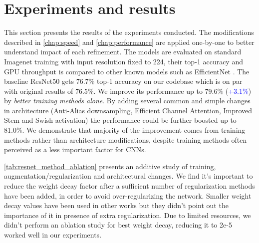 % 
\chapter{Experiments and results}


This section presents the results of the experiments conducted. The modifications described in \autoref{chap:speed} and \autoref{chap:performance} are applied one-by-one to better understand impact of each refinement. The models are evaluated on standard Imagenet training with input resolution fixed to 224, their top-1 accuracy and GPU throughput is compared to other known models such as EfficientNet \cite{tan2019_efficientnet}. The baseline ResNet50 gets 76.7\% top-1 accuracy on our codebase which is on par with original results of 76.5\%. We improve its performance up to 79.6\% (\textcolor{blue}{+3.1\%}) by \textit{better training methods alone}. By adding several common and simple changes in architecture (Anti-Alias downsampling, Efficient Channel Attention, Improved Stem and Swish activation) the performance could be further boosted up to 81.0\%. We demonstrate that majority of the improvement comes from training methods rather than architecture modifications, despite training methods often perceived as a less important factor for CNNs.  

\autoref{tab:resnet_method_ablation} presents an additive study of training, augmentation/regularization and architectural changes. We find it's important to reduce the weight decay factor after a sufficient number of regularization methods have been added, in order to avoid over-regularizing the network. Smaller weight decay values have been used in other works \cite{tan2019_efficientnet} \cite{bello2021_revisiting_resnet} but they didn't point out the importance of it in presence of extra regularization. Due to limited resources, we didn't perform an ablation study for best weight decay, reducing it to 2e-5 worked well in our experiments.




